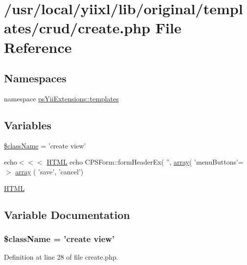 \hypertarget{create_8php}{
\section{/usr/local/yiixl/lib/original/templates/crud/create.php File Reference}
\label{create_8php}
}
\subsection*{Namespaces}
\begin{DoxyCompactItemize}
\item 
namespace \hyperlink{namespacepsYiiExtensions_1_1templates}{psYiiExtensions::templates}
\end{DoxyCompactItemize}
\subsection*{Variables}
\begin{DoxyCompactItemize}
\item 
\hyperlink{create_8php_acd6a475a6eeb092f4eea3e19e502d67d}{\$className} = 'create view'
\item 
echo$<$$<$$<$ \hyperlink{module_8php_a2c8135527015cd4586959ac7c2ffec92}{HTML} echo CPSForm::formHeaderEx( '', \hyperlink{list_8php_aa3205d038c7f8feb5c9f01ac4dfadc88}{array}( 'menuButtons'=$>$ \hyperlink{create_8php_a2e825f14d55b6ef1004d21af5dd9786b}{array} ( 'save', 'cancel')
\item 
\hyperlink{create_8php_a2c8135527015cd4586959ac7c2ffec92}{HTML}
\end{DoxyCompactItemize}


\subsection{Variable Documentation}
\hypertarget{create_8php_acd6a475a6eeb092f4eea3e19e502d67d}{
\subsubsection[{\$className}]{\setlength{\rightskip}{0pt plus 5cm}\$className = 'create view'}}
\label{create_8php_acd6a475a6eeb092f4eea3e19e502d67d}


Definition at line 28 of file create.php.

